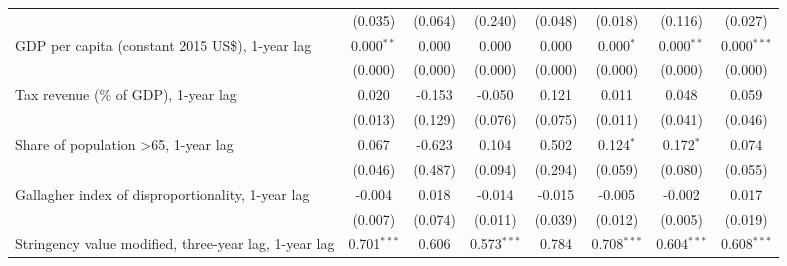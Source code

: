 \begin{table}[htbp]
\begin{tabular}{lccccccc}
                                                                                                  & (0.035)       & (0.064)                   & (0.240)        & (0.048)          & (0.018)         & (0.116)         & (0.027)\\   
      GDP per capita (constant 2015 US\$), 1-year lag                                             & 0.000$^{**}$  & 0.000                     & 0.000          & 0.000            & 0.000$^{*}$     & 0.000$^{**}$    & 0.000$^{***}$\\   
                                                                                                  & (0.000)       & (0.000)                   & (0.000)        & (0.000)          & (0.000)         & (0.000)         & (0.000)\\   
      Tax revenue (\% of GDP), 1-year lag                                                         & 0.020         & -0.153                    & -0.050         & 0.121            & 0.011           & 0.048           & 0.059\\   
                                                                                                  & (0.013)       & (0.129)                   & (0.076)        & (0.075)          & (0.011)         & (0.041)         & (0.046)\\   
      Share of population >65, 1-year lag                                                         & 0.067         & -0.623                    & 0.104          & 0.502            & 0.124$^{*}$     & 0.172$^{*}$     & 0.074\\   
                                                                                                  & (0.046)       & (0.487)                   & (0.094)        & (0.294)          & (0.059)         & (0.080)         & (0.055)\\   
      Gallagher index of disproportionality, 1-year lag                                           & -0.004        & 0.018                     & -0.014         & -0.015           & -0.005          & -0.002          & 0.017\\   
                                                                                                  & (0.007)       & (0.074)                   & (0.011)        & (0.039)          & (0.012)         & (0.005)         & (0.019)\\   
      Stringency value modified, three-year lag, 1-year lag                                       & 0.701$^{***}$ & 0.606                     & 0.573$^{***}$  & 0.784            & 0.708$^{***}$   & 0.604$^{***}$   & 0.608$^{***}$\\   

\end{tabular}
\end{table}

